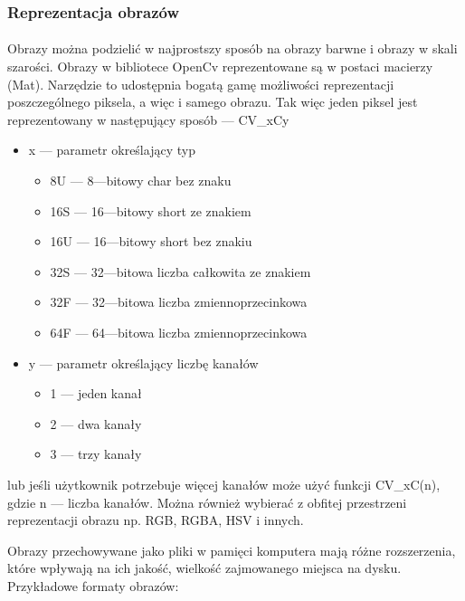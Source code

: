 \documentclass[a4paper,12pt]{article}
\begin{document}
    	\subsubsection{Reprezentacja obrazów}
	    \paragraph{\indent} Obrazy można podzielić w najprostszy sposób na obrazy barwne i obrazy w skali szarości. Obrazy w bibliotece OpenCv reprezentowane są w postaci macierzy (Mat). Narzędzie to udostępnia bogatą gamę możliwości reprezentacji poszczególnego piksela, a więc i samego obrazu. Tak więc jeden piksel jest reprezentowany w następujący sposób --- CV\_xCy
	    \begin{spacing}{1}
	    \begin{itemize}
	        \item{x --- parametr określający typ}
	            \begin{itemize}
	            \item{8U --- 8---bitowy char bez znaku}
	            \item{16S --- 16---bitowy short ze znakiem}
	            \item{16U --- 16---bitowy short bez znakiu}
	            \item{32S --- 32---bitowa liczba całkowita ze znakiem}
	            \item{32F --- 32---bitowa liczba zmiennoprzecinkowa}
	            \item{64F --- 64---bitowa liczba zmiennoprzecinkowa}
	            \end{itemize}
	        \item{y  --- parametr określający liczbę kanałów}
	            \begin{itemize}
	            \item{1 --- jeden kanał}
	            \item{2 --- dwa kanały}
	            \item{3 --- trzy kanały}
	            \end{itemize}
	    \end{itemize}
	    \end{spacing}
	    lub jeśli użytkownik potrzebuje więcej kanałów może użyć funkcji CV\_xC(n), gdzie n --- liczba kanałów. Można również wybierać z obfitej przestrzeni reprezentacji obrazu np. RGB, RGBA, HSV i innych. \par
	    Obrazy przechowywane jako pliki w pamięci komputera mają różne rozszerzenia, które wpływają na ich jakość, wielkość zajmowanego miejsca na dysku. Przykładowe formaty obrazów: 
        
\end{document}
